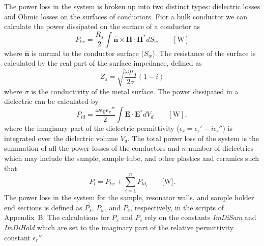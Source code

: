 The power loss in the system is broken up into two distinct types: dielectric losses and Ohmic losses on the surfaces of conductors. Fior a bulk conductor we can calculate the power dissipated on the surface of a conductor as
\begin{equation}
    P_{lw} = \frac{R_s}{2}\int \mathbf{\hat{n}}\times\mathbf{H}\cdot\mathbf{H}^* dS_w \qquad [\text{W}]
\end{equation}
where $\mathbf{\hat{n}}$ is normal to the conductor surface ($S_w$). The resistance of the surface is calculated by the real part of the surface impedance, defined as
\begin{equation}
    Z_s = \sqrt{\frac{\omega \mu_0}{2 \sigma}}(1-i)
\end{equation}
where $\sigma$ is the conductivity of the metal surface. The power dissipated in a dielectric can be calculated by
\begin{equation}
    P_{ld} = \frac{\omega \epsilon_0 \epsilon_r''}{2}\int \mathbf{E} \cdot \mathbf{E}^* dV_d \qquad [\text{W}],
\end{equation}
where the imaginary part of the dielectric permittivity ($\epsilon_r = \epsilon_r' - i \epsilon_r''$) is integrated over the dielectric volume $V_d$. \cite{jackson1975classical,harrington1961time} The total power loss of the system is the summation of all the power losses of the conductors and $n$ number of dielectrics which may include the sample, sample tube, and other plastics and ceramics such that
\begin{equation}
    P_l = P_{lw} + \sum_{i=1}^n P_{ld_i} \qquad \text{[W].}
\end{equation}
The power loss in the system for the sample, resonator walls, and sample holder end sections is defined as $P_s$, $P_w$, and $P_e$, respectively, in the scripts of Appendix~B. The calculations for $P_s$ and $P_e$ rely on the constants \textit{ImDiSam} and \textit{ImDiHold} which are set to the imaginary part of the relative permittivity constant $\epsilon_r''$.


